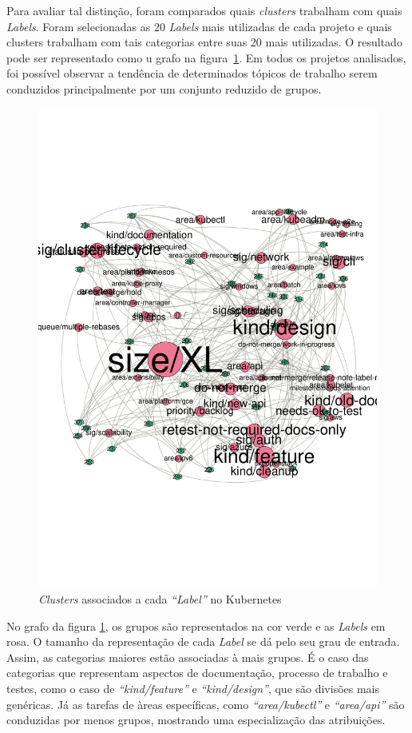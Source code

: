 \documentclass[12pt,openany,oneside,a4paper,english,brazil]{abntbibufjf}
\begin{document}
Para avaliar tal distinção, foram comparados quais \textit{clusters} trabalham com quais \textit{Labels}. Foram selecionadas as 20 \textit{Labels} mais utilizadas de cada projeto e quais clusters trabalham com tais categorias entre suas 20 mais utilizadas. O resultado pode ser representado como u grafo na figura~\ref{fig:graph-labels-kubernetes}. Em todos os projetos analisados, foi possível observar a tendência de determinados tópicos de trabalho serem conduzidos principalmente por um conjunto reduzido de grupos.

\begin{figure}[htbp]
  \centerline{\includegraphics[width=.7\linewidth]{graph-labels-kubernetes}}
  \caption{\textit{Clusters} associados a cada \textit{``Label''} no Kubernetes}
  \label{fig:graph-labels-kubernetes}
\end{figure}

No grafo da figura \ref{fig:graph-labels-kubernetes}, os grupos são representados na cor verde e as \textit{Labels} em rosa. O tamanho da representação de cada \textit{Label} se dá pelo seu grau de entrada. Assim, as categorias maiores estão associadas à mais grupos. É o caso das categorias que representam aspectos de documentação, processo de trabalho e testes, como o caso de \textit{``kind/feature''} e \textit{``kind/design''}, que são divisões mais genéricas. Já as tarefas de àreas específicas, como \textit{``area/kubectl''} e \textit{``area/api''} são conduzidas por menos grupos, mostrando uma especialização das atribuições.
\end{document}

